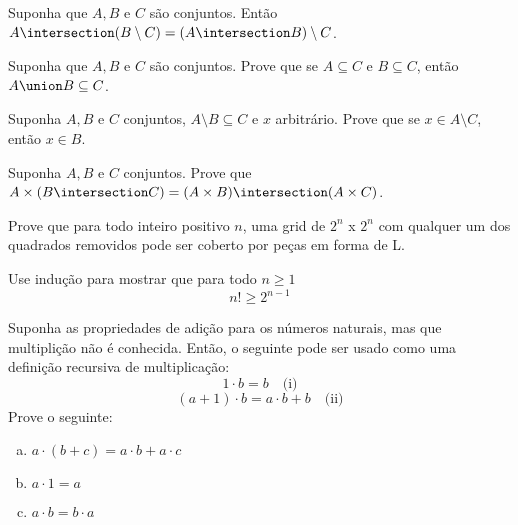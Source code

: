 \begin{exercise}
	Suponha que $A, B$ e $C$ são conjuntos. Então $A \intersection (B \setminus C) = (A \intersection B) \setminus C$.
\end{exercise}

\begin{exercise}
	Suponha que $A, B$ e $C$ são conjuntos. Prove que se $A \subseteq C$ e $B \subseteq C$, então $A \union B \subseteq C$.
\end{exercise}

\begin{exercise}
	Suponha $A, B$ e $C$ conjuntos, $A \setminus B \subseteq C$ e $x$ arbitrário. Prove que se $x \in A \setminus C$, então $x \in B$.
\end{exercise}

\begin{exercise}
	Suponha $A, B$ e $C$ conjuntos. Prove que $A \times (B \intersection C) = (A \times B) \intersection (A \times C)$.
\end{exercise}

\begin{exercise}
	Prove que para todo inteiro positivo $n$, uma grid de $2^n$ x $2^n$ com qualquer um dos quadrados removidos pode ser coberto por peças em forma de L.
\end{exercise}

\begin{exercise}
	Use indução para mostrar que para todo $n \geq 1$
	$$
	n! \geq 2^{n - 1} 
	$$
\end{exercise}

\begin{exercise}
	Suponha as propriedades de adição para os números naturais, mas que multiplição não é conhecida. Então, o seguinte pode ser usado como uma definição recursiva de multiplicação:
	$$
		1 \cdot b = b \quad \text{(i)}
	$$
	$$
		(a + 1) \cdot b = a \cdot b + b \quad \text{(ii)}
	$$
	Prove o seguinte:
	\begin{enumerate}[(a)]
		\item $a \cdot (b + c) = a \cdot b + a \cdot c$
		\item $a \cdot 1 = a$
		\item $a \cdot b = b \cdot a$
	\end{enumerate}
\end{exercise}
